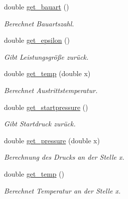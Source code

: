 \begin{DoxyCompactItemize}
double \hyperlink{class_rohrstroemung_ac4d2f31e451f1a3c97627d3a87df419d}{get\+\_\+bauart} ()
\begin{DoxyCompactList}\small\item\em Berechnet Bauartszahl. \end{DoxyCompactList}\item 
\mbox{\label{class_rohrstroemung_a47b2ddadb37169a3a21bcc914a772894}} 
double \hyperlink{class_rohrstroemung_a47b2ddadb37169a3a21bcc914a772894}{get\+\_\+epsilon} ()
\begin{DoxyCompactList}\small\item\em Gibt Leistungsgröße zurück. \end{DoxyCompactList}\item 
\mbox{\label{class_rohrstroemung_adc94a5748b40f9e47448a11e55809593}} 
double \hyperlink{class_rohrstroemung_adc94a5748b40f9e47448a11e55809593}{get\+\_\+temp} (double x)
\begin{DoxyCompactList}\small\item\em Berechnet Austrittstemperatur. \end{DoxyCompactList}\item 
\mbox{\label{class_rohrstroemung_adaf6779654f5f8d01845bf38aa9655f9}} 
double \hyperlink{class_rohrstroemung_adaf6779654f5f8d01845bf38aa9655f9}{get\+\_\+startpressure} ()
\begin{DoxyCompactList}\small\item\em Gibt Startdruck zurück. \end{DoxyCompactList}\item 
\mbox{\label{class_rohrstroemung_abf6265814d9ae0d148aeecb6092d8c2f}} 
double \hyperlink{class_rohrstroemung_abf6265814d9ae0d148aeecb6092d8c2f}{get\+\_\+pressure} (double x)
\begin{DoxyCompactList}\small\item\em Berechnung des Drucks an der Stelle x. \end{DoxyCompactList}\item 
\mbox{\label{class_rohrstroemung_a46d4e8bb41a8204b96fe0420087e69ec}} 
double \hyperlink{class_rohrstroemung_a46d4e8bb41a8204b96fe0420087e69ec}{get\+\_\+temp} ()
\begin{DoxyCompactList}\small\item\em Berechnet Temperatur an der Stelle x. \end{DoxyCompactList}\item 

\end{DoxyCompactItemize}
